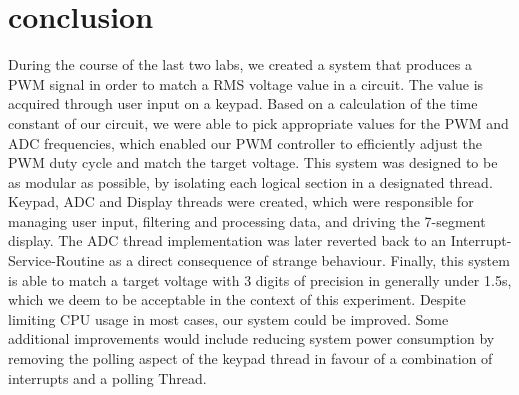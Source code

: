\section{conclusion}

\label{section:conclusion}



During the course of the last two labs, we created a system that produces a PWM signal in order to match a RMS voltage value in a circuit. The value is acquired through user input on a keypad. Based on a calculation of the time constant of our circuit, we were able to pick appropriate values for the PWM and ADC frequencies, which enabled our PWM controller to efficiently adjust the PWM duty cycle and match the target voltage. This system was designed to be as modular as possible, by isolating each logical section in a designated thread. Keypad, ADC and Display threads were created, which were responsible for managing user input, filtering and processing data, and driving the 7-segment display. The ADC thread implementation was later reverted back to an Interrupt-Service-Routine as a direct consequence of strange behaviour. Finally, this system is able to match a target voltage with 3 digits of precision in generally under 1.5s, which we deem to be acceptable in the context of this experiment. Despite limiting CPU usage in most cases, our system could be improved. Some additional improvements would include reducing system power consumption by removing the polling aspect of the keypad thread in favour of a combination of interrupts and a polling Thread.


%
%

